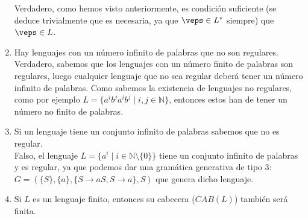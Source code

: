 \begin{enumerate}
        Verdadero, como hemos visto anteriormente, es condición suficiente (se deduce trivialmente que es necesaria, ya que $\veps \in L^\ast$ siempre) que $\veps \in L$.
    \item Hay lenguajes con un número infinito de palabras que no son regulares.\\

        Verdadero, sabemos que los lenguajes con un número finito de palabras son regulares, luego cualquier lenguaje que no sea regular deberá tener un número infinito de palabras. Como sabemos la existencia de lenguajes no regulares, como por ejemplo $L = \{a^ib^ja^i b^j \mid i,j\in \mathbb{N}\}$, entonces estos han de tener un número no finito de palabras.
    \item Si un lenguaje tiene un conjunto infinito de palabras sabemos que no es regular.\\

        Falso, el lenguaje $L=\{a^i \mid i \in \mathbb{N}\setminus \{0\}\}$ tiene un conjunto infinito de palabras y es regular, ya que podemos dar una gramática generativa de tipo 3:\newline $G=(\{S\}, \{a\}, \{S\rightarrow aS, S\rightarrow a\}, S)$ que genera dicho lenguaje.
    \item Si $L$ es un lenguaje finito, entonces su cabecera ($CAB(L)$) también será finita.\\


\end{enumerate}
